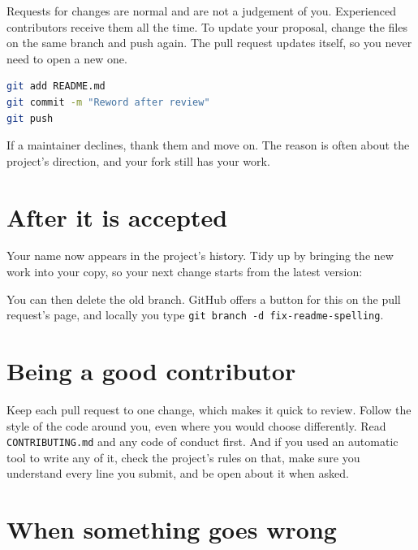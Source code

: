 Requests for changes are normal and are not a judgement of you. Experienced contributors receive them all the time. To update your proposal, change the files on the same branch and push again. The pull request updates itself, so you never need to open a new one.

\begin{lstlisting}[language=bash]
git add README.md
git commit -m "Reword after review"
git push
\end{lstlisting}

If a maintainer declines, thank them and move on. The reason is often about the project's direction, and your fork still has your work.

\section{After it is accepted}

Your name now appears in the project's history. Tidy up by bringing the new work into your copy, so your next change starts from the latest version:



You can then delete the old branch. GitHub offers a button for this on the pull request's page, and locally you type \texttt{git branch -d fix-readme-spelling}.

\section{Being a good contributor}

Keep each pull request to one change, which makes it quick to review. Follow the style of the code around you, even where you would choose differently. Read \texttt{CONTRIBUTING.md} and any code of conduct first. And if you used an automatic tool to write any of it, check the project's rules on that, make sure you understand every line you submit, and be open about it when asked.

\section{When something goes wrong}

